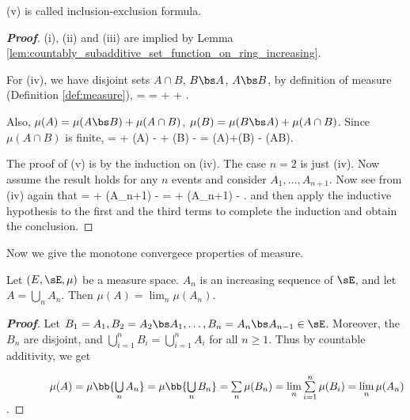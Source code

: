 \begin{remark}
(v) is called inclusion-exclusion formula.
\end{remark}

\begin{proof}[\bf Proof]
(i), (ii) and (iii) are implied by Lemma \ref{lem:countably_subadditive_set_function_on_ring_increasing}.

For (iv), we have disjoint sets $A\cap B$, $B\bs A$, $A\bs B$, by definition of measure (Definition \ref{def:measure}),
\be
\mu{} = \mu {} = \mu{} + \mu{} + \mu{}.
\ee

Also, $\mu(A) = \mu(A\bs B) + \mu(A\cap B)$, $\mu(B) = \mu(B\bs A) + \mu(A\cap B)$. Since $\mu(A\cap B)$ is finite,
\be
\mu{} = \mu{} + \mu(A) - \mu{} + \mu(B) - \mu{} = \mu(A)+\mu(B) - \mu(A\cap B).
\ee

The proof of (v) is by the induction on (iv). The case $n = 2$ is just (iv). Now assume the result holds for any $n$ events and consider $A_1,\dots,A_{n+1}$. Now see from (iv) again that
\be\label{equ:inclusion_exclusion_measure}
\mu{} = \mu{} + \mu(A_{n+1}) - \mu{}\nonumber = \mu{} + \mu(A_{n+1}) - \mu{}.
\ee
and then apply the inductive hypothesis to the first and the third terms to complete the induction and obtain the conclusion.
\end{proof}



Now we give the monotone convergece properties of measure.

\begin{lemma}\label{lem:measure_increasing_sequence}
Let $(E,\sE,\mu)$ be a measure space. $A_n$ is an increasing sequence of $\sE$, and let $A=\bigcup_n A_n$. Then $\mu(A) = \lim_n\mu(A_n)$.
\end{lemma}

\begin{proof}[\bf Proof]
Let $B_1=A_1,B_2 = A_2\bs A_1, \dots, B_n = A_n\bs A_{n-1}\in \sE$. Moreover, the $B_n$ are disjoint, and $\bigcup^n_{i=1}B_i = \bigcup^n_{i=1}A_i$ for all $n\geq 1$. Thus by countable additivity, we get
\vspace{2mm}

$\quad\quad\quad\quad\mu(A) = \mu\bb{\bigcup\limits_n A_n} = \mu\bb{\bigcup\limits_n B_n} = \sum\limits_n \mu(B_n) = \lim\limits_n\sum\limits^n_{i=1}\mu(B_i) = \lim\limits_n \mu(A_n)$.
\end{proof}

